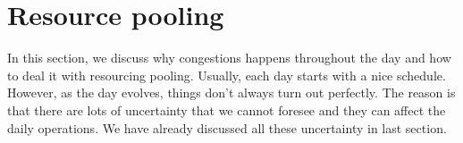 \section{Resource pooling}

In this section, we discuss why congestions happens throughout the day and how to deal it with resourcing pooling. Usually, each day starts with a nice schedule. However, as the day evolves, things don't always turn out perfectly. The reason is that there are lots of uncertainty that we cannot foresee and they can affect the daily operations. We have already discussed all these uncertainty in last section.



